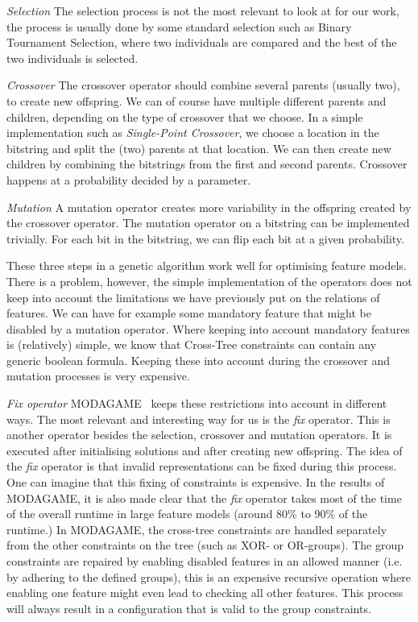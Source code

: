 \textit{Selection} The selection process is not the most relevant
to look at for our work, the process is usually done by some standard
selection such as Binary Tournament Selection, where two individuals are
compared and the best of the two individuals is selected.

\textit{Crossover} The crossover operator should combine several parents
(usually two), to create new offspring. We can of course have multiple
different parents and children, depending on the type of crossover that we
choose. In a simple implementation such as \emph{Single-Point Crossover}, we
choose a location in the bitstring and split the (two) parents at that
location. We can then create new children by combining the bitstrings from
the first and second parents. Crossover happens at a probability decided by a 
parameter.

\textit{Mutation} A mutation operator creates more variability in the 
offspring created by the crossover operator. The mutation operator on a bitstring
can be implemented trivially. For each bit in the bitstring, we can flip each bit
at a given probability.

These three steps in a genetic algorithm work well for optimising feature models.
There is a problem, however, the simple implementation of the operators does not
keep into account the limitations we have previously put on the relations of features.
We can have for example some mandatory feature that might be disabled by a mutation
operator. Where keeping into account mandatory features is (relatively) simple,
we know that Cross-Tree constraints can contain any generic boolean formula. 
Keeping these into account during the crossover and mutation processes is very
expensive.

\textit{Fix operator} MODAGAME~\cite{pascual2015modagame} keeps these restrictions
into account in different ways. The most relevant and interesting way for us is the
\emph{fix} operator. This is another operator besides the selection, crossover and
mutation operators. It is executed after initialising solutions and after creating
new offspring. The idea of the \emph{fix} operator is that invalid representations
can be fixed during this process. One can imagine that this fixing of constraints
is expensive. In the results of MODAGAME, it is also made clear that the \emph{fix}
operator takes most of the time of the overall runtime in large feature models
(around 80\% to 90\% of the runtime.) In MODAGAME, the cross-tree constraints are
handled separately from the other constraints on the tree (such as XOR- or OR-groups).
The group constraints are repaired by enabling disabled features in an allowed manner
(i.e. by adhering to the defined groups), this is an expensive recursive operation
where enabling one feature might even lead to checking all other features. This process
will always result in a configuration that is valid to the group constraints.

